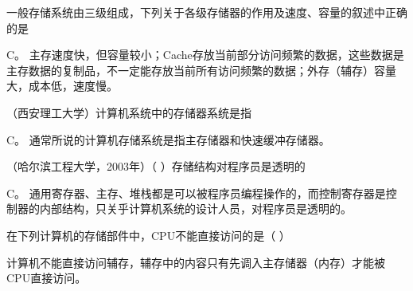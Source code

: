 \question 一般存储系统由三级组成，下列关于各级存储器的作用及速度、容量的叙述中正确的是
\par{}
\begin{solution}C。
主存速度快，但容量较小；Cache存放当前部分访问频繁的数据，这些数据是主存数据的复制品，不一定能存放当前所有访问频繁的数据；外存（辅存）容量大，成本低，速度慢。
\end{solution}
\question （西安理工大学）计算机系统中的存储器系统是指
\par{}
\begin{solution}C。 通常所说的计算机存储系统是指主存储器和快速缓冲存储器。
\end{solution}
\question （哈尔滨工程大学，2003年）（ ）存储结构对程序员是透明的
\par{}
\begin{solution}C。
通用寄存器、主存、堆栈都是可以被程序员编程操作的，而控制寄存器是控制器的内部结构，只关乎计算机系统的设计人员，对程序员是透明的。
\end{solution}
\question 在下列计算机的存储部件中，CPU不能直接访问的是（ ）
\par{}
\begin{solution}计算机不能直接访问辅存，辅存中的内容只有先调入主存储器（内存）才能被CPU直接访问。
\end{solution}
